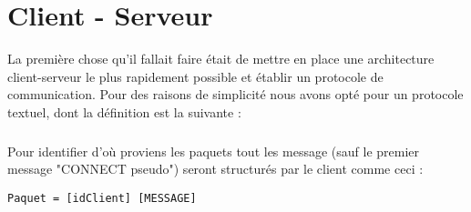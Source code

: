 \chapter{Client - Serveur}

La première chose qu'il fallait faire était de mettre en place une architecture client-serveur le plus rapidement possible et établir un protocole de communication. Pour des raisons de simplicité nous avons opté pour un protocole textuel, dont la définition est la suivante :

\paragraph{}
Pour identifier d'où proviens les paquets tout les message (sauf le premier message "CONNECT pseudo") seront structurés par le client comme ceci :
\begin{verbatim}Paquet = [idClient] [MESSAGE]\end{verbatim}

